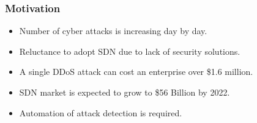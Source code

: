 \documentclass[10pt]{beamer}
\begin{document}
\begin{frame}
\frametitle{Motivation}
\begin{center}
\begin{itemize}
\footnotesize
\item 
Number of cyber attacks is increasing day by day.
\item
Reluctance to adopt SDN due to lack of security solutions.
\item
A single DDoS attack can cost an enterprise over \$1.6 million.
\item
SDN market is expected to grow to \$56 Billion by 2022.
\item
Automation of attack detection is required.
 
\end{itemize}
\end{center}

\end{frame}



\end{document}
